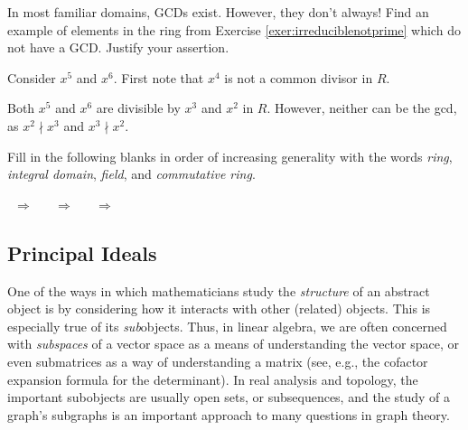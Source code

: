 \documentclass[english,course]{lecture}
\newenvironment{solution}[1][Solution]{\begin{trivlist}\pushQED{\qed}\item[\hskip \labelsep  \bfseries #1{}.\hspace{10pt}]}{\popQED\end{trivlist}}\renewcommand{\qedsymbol}{$\checkmark$}{\newenvironment{answer}{\renewcommand\qedsymbol{$\blacklozenge$}\begin{proof}[Answer]}{\end{proof}}}\newenvironment{answer}[1][Answer]{\begin{trivlist}\pushQED{\qed}\item[\hskip \labelsep  \bfseries #1{}.\hspace{10pt}]}{\popQED\end{trivlist}}\renewcommand{\qedsymbol}{$\lozenge$}
\theoremstyle{plain}
\def\presnotes{}
\begin{document}
\presnotes


\begin{exer}
	In most familiar domains, GCDs exist.
	However, they don't always!
	Find an example of elements in the ring from Exercise \ref{exer:irreduciblenotprime} which do not have a GCD.
	Justify your assertion.
\end{exer}

\begin{solution}
	Consider $x^5$ and $x^6$.
	First note that $x^4$ is not a common divisor in $R$.
	
	Both $x^5$ and $x^6$ are divisible by $x^3$ and $x^2$ in $R$.
	However, neither can be the gcd, as $x^2\nmid x^3$ and $x^3\nmid x^2$.
\end{solution}

\presnotes

\begin{exer}\label{exer:ringgeneralityone}
	Fill in the following blanks in order of increasing generality with the words \emph{ring}, \emph{integral domain}, \emph{field}, and \emph{commutative ring}.
	
	\begin{center}
		\makebox[0.75in]{\hrulefill} \ $\Rightarrow$ \ \makebox[0.75in]{\hrulefill} \ $\Rightarrow$ \ \makebox[0.75in]{\hrulefill} \ $\Rightarrow$ \ \makebox[0.75in]{\hrulefill} 
	\end{center}
\end{exer}

\presnotes

\clearpage



\subsection{Principal Ideals}\label{SubSec-Principal-Ideals}

One of the ways in which mathematicians study the \emph{structure} of an abstract object is by considering how it interacts with other (related) objects.
This is especially true of its \emph{sub}objects.
Thus, in linear algebra, we are often concerned with \emph{subspaces} of a vector space as a means of understanding the vector space, or even submatrices as a way of understanding a matrix (see, e.g., the cofactor expansion formula for the determinant).
In real analysis and topology, the important subobjects are usually open sets, or subsequences, and the study of a graph's subgraphs is an important approach to many questions in graph theory.
\end{document}

